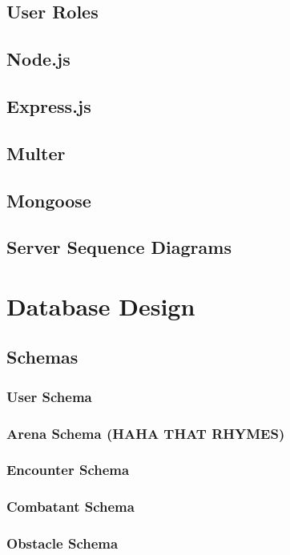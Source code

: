 \documentclass[12pt,a4paper]{report}
\begin{document}
	\section{User Roles}
	\section{Node.js}
	\section{Express.js}
	\section{Multer}
	\section{Mongoose}
	\section{Server Sequence Diagrams}

\newpage
\chapter*{Database Design}
	\section{Schemas}
		\subsection{User Schema}
		\subsection{Arena Schema (HAHA THAT RHYMES)}
		\subsection{Encounter Schema}
		\subsection{Combatant Schema}
		\subsection{Obstacle Schema}

\newpage
\end{document}
